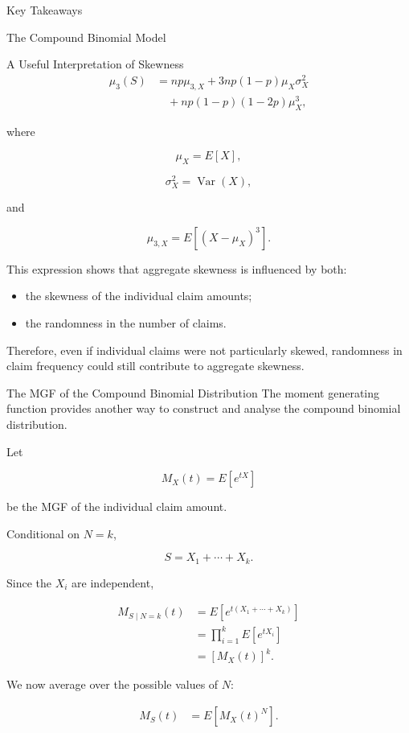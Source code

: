 \documentclass[
  ignorenonframetext,
  aspectratio=169,
]{beamer}
\providecommand{\tightlist}{%
  \setlength{\itemsep}{0pt}\setlength{\parskip}{0pt}}
\begin{document}
\begin{frame}{Key Takeaways}
\begin{block}{The Compound Binomial Model}
\begin{block}{A Useful Interpretation of Skewness}
\[
\begin{aligned}
\mu_3(S)
&=
np\mu_{3,X}
+
3np(1-p)\mu_X\sigma_X^2\\
&\quad
+
np(1-p)(1-2p)\mu_X^3,
\end{aligned}
\]

where

\[
\mu_X=E[X],
\]

\[
\sigma_X^2=\operatorname{Var}(X),
\]

and

\[
\mu_{3,X}
=
E[(X-\mu_X)^3].
\]

This expression shows that aggregate skewness is influenced by both:

\begin{itemize}
\tightlist
\item
  the skewness of the individual claim amounts;
\item
  the randomness in the number of claims.
\end{itemize}

Therefore, even if individual claims were not particularly skewed,
randomness in claim frequency could still contribute to aggregate
skewness.
\end{block}

\begin{block}{The MGF of the Compound Binomial Distribution}
\protect{}\label{the-mgf-of-the-compound-binomial-distribution}
The moment generating function provides another way to construct and
analyse the compound binomial distribution.

Let

\[
M_X(t)=E[e^{tX}]
\]

be the MGF of the individual claim amount.

Conditional on \(N=k\),

\[
S=X_1+\cdots+X_k.
\]

Since the \(X_i\) are independent,

\[
\begin{aligned}
M_{S\mid N=k}(t)
&=
E[e^{t(X_1+\cdots+X_k)}]\\
&=
\prod_{i=1}^{k}E[e^{tX_i}]\\
&=
[M_X(t)]^k.
\end{aligned}
\]

We now average over the possible values of \(N\):

\[
\begin{aligned}
M_S(t)
&=
E[M_X(t)^N].
\end{aligned}
\]


\end{block}
\end{block}
\end{frame}
\end{document}
